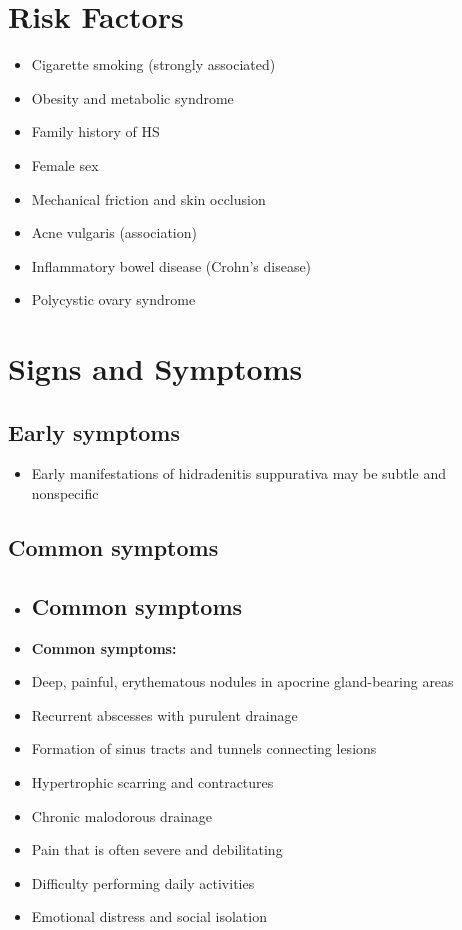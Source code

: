 \section{Risk Factors}

\begin{itemize}[noitemsep]
  \item Cigarette smoking (strongly associated)
  \item Obesity and metabolic syndrome
  \item Family history of HS
  \item Female sex
  \item Mechanical friction and skin occlusion
  \item Acne vulgaris (association)
  \item Inflammatory bowel disease (Crohn's disease)
  \item Polycystic ovary syndrome
\end{itemize}

\section{Signs and Symptoms}

\subsection{Early symptoms}
\begin{itemize}[noitemsep]
  \item Early manifestations of hidradenitis suppurativa may be subtle and nonspecific
\end{itemize}

\subsection{Common symptoms}
\begin{itemize}[noitemsep]
  \item \subsection{Common symptoms}
  \item \textbf{Common symptoms:}
  \item Deep, painful, erythematous nodules in apocrine gland-bearing areas
  \item Recurrent abscesses with purulent drainage
  \item Formation of sinus tracts and tunnels connecting lesions
  \item Hypertrophic scarring and contractures
  \item Chronic malodorous drainage
  \item Pain that is often severe and debilitating
  \item Difficulty performing daily activities
  \item Emotional distress and social isolation
\end{itemize}


